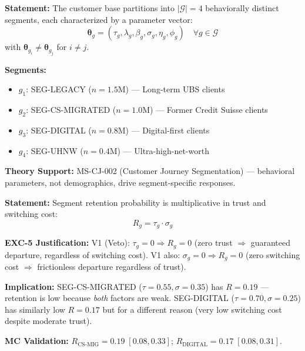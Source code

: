 \begin{tcolorbox}[colback=gray!5!white, colframe=gray!75!black,
    title=Axiom AIM-7: Segment Behavioral Heterogeneity]
\label{ax:aim-7}

\textbf{Statement:}
The customer base partitions into $|\mathcal{G}| = 4$ behaviorally distinct
segments, each characterized by a parameter vector:
\begin{equation}
\boldsymbol{\theta}_g = (\tau_g, \lambda_g, \beta_g, \sigma_g, \eta_g, \phi_g)
\quad \forall g \in \mathcal{G}
\label{eq:aim-segment-params}
\end{equation}
with $\boldsymbol{\theta}_{g_i} \neq \boldsymbol{\theta}_{g_j}$ for $i \neq j$.

\textbf{Segments:}
\begin{itemize}[nosep]
\item $g_1$: SEG-LEGACY ($n = 1.5$M) --- Long-term UBS clients
\item $g_2$: SEG-CS-MIGRATED ($n = 1.0$M) --- Former Credit Suisse clients
\item $g_3$: SEG-DIGITAL ($n = 0.8$M) --- Digital-first clients
\item $g_4$: SEG-UHNW ($n = 0.4$M) --- Ultra-high-net-worth
\end{itemize}

\textbf{Theory Support:} MS-CJ-002 (Customer Journey Segmentation) ---
behavioral parameters, not demographics, drive segment-specific responses.
\end{tcolorbox}


\begin{tcolorbox}[colback=gray!5!white, colframe=gray!75!black,
    title=Axiom AIM-8: Multiplicative Retention]
\label{ax:aim-8}

\textbf{Statement:}
Segment retention probability is multiplicative in trust and switching cost:
\begin{equation}
R_g = \tau_g \cdot \sigma_g
\label{eq:aim-retention}
\end{equation}

\textbf{EXC-5 Justification:}
V1 (Veto): $\tau_g = 0 \Rightarrow R_g = 0$ (zero trust $\Rightarrow$ guaranteed departure,
regardless of switching cost). V1 also: $\sigma_g = 0 \Rightarrow R_g = 0$
(zero switching cost $\Rightarrow$ frictionless departure regardless of trust).

\textbf{Implication:} SEG-CS-MIGRATED ($\tau = 0.55, \sigma = 0.35$) has
$R = 0.19$ --- retention is low because \emph{both} factors are weak.
SEG-DIGITAL ($\tau = 0.70, \sigma = 0.25$) has similarly low $R = 0.17$
but for a different reason (very low switching cost despite moderate trust).

\textbf{MC Validation:}
$R_{\text{CS-MIG}} = 0.19 \; [0.08, 0.33]$;
$R_{\text{DIGITAL}} = 0.17 \; [0.08, 0.31]$.
\end{tcolorbox}


